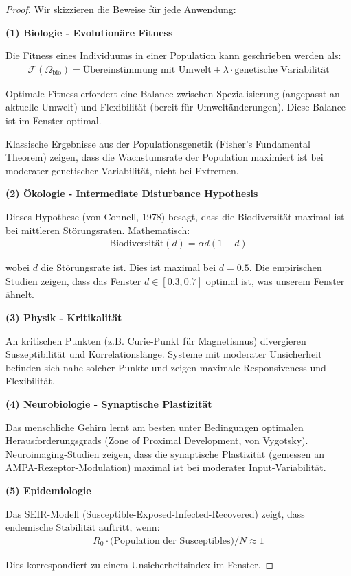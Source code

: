 \documentclass[a4paper,12pt,twoside]{report}
\theoremstyle{definition}
\begin{document}
\begin{proof}

Wir skizzieren die Beweise für jede Anwendung:

\textbf{(1) Biologie - Evolutionäre Fitness}

Die Fitness eines Individuums in einer Population kann geschrieben werden als:
\begin{align}
\mathcal{F}(\Omega_{\text{bio}}) = \text{Übereinstimmung mit Umwelt} + \lambda \cdot \text{genetische Variabilität}
\end{align}

Optimale Fitness erfordert eine Balance zwischen Spezialisierung (angepasst an aktuelle Umwelt) und Flexibilität (bereit für Umweltänderungen). Diese Balance ist im Fenster optimal.

Klassische Ergebnisse aus der Populationsgenetik (Fisher's Fundamental Theorem) zeigen, dass die Wachstumsrate der Population maximiert ist bei moderater genetischer Variabilität, nicht bei Extremen.

\textbf{(2) Ökologie - Intermediate Disturbance Hypothesis}

Dieses Hypothese (von Connell, 1978) besagt, dass die Biodiversität maximal ist bei mittleren Störungsraten. Mathematisch:
\begin{align}
\text{Biodiversität}(d) = \alpha d(1-d)
\end{align}

wobei $d$ die Störungsrate ist. Dies ist maximal bei $d = 0.5$. Die empirischen Studien zeigen, dass das Fenster $d \in [0.3, 0.7]$ optimal ist, was unserem Fenster ähnelt.

\textbf{(3) Physik - Kritikalität}

An kritischen Punkten (z.B. Curie-Punkt für Magnetismus) divergieren Suszeptibilität und Korrelationslänge. Systeme mit moderater Unsicherheit befinden sich nahe solcher Punkte und zeigen maximale Responsiveness und Flexibilität.

\textbf{(4) Neurobiologie - Synaptische Plastizität}

Das menschliche Gehirn lernt am besten unter Bedingungen optimalen Herausforderungsgrads (Zone of Proximal Development, von Vygotsky). Neuroimaging-Studien zeigen, dass die synaptische Plastizität (gemessen an AMPA-Rezeptor-Modulation) maximal ist bei moderater Input-Variabilität.

\textbf{(5) Epidemiologie}

Das SEIR-Modell (Susceptible-Exposed-Infected-Recovered) zeigt, dass endemische Stabilität auftritt, wenn:
\begin{align}
R_0 \cdot \text{(Population der Susceptibles)} / N \approx 1
\end{align}

Dies korrespondiert zu einem Unsicherheitsindex im Fenster.

\end{proof}
\end{document}
